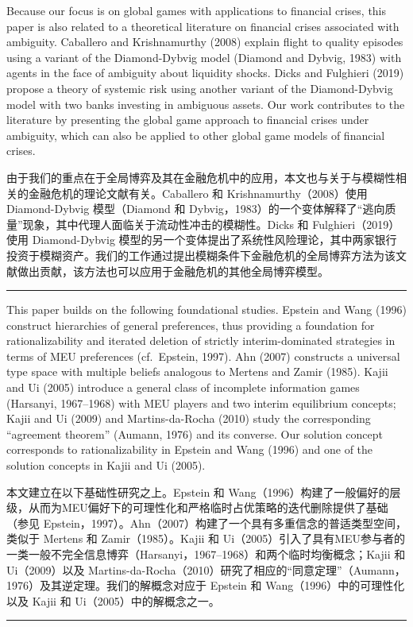 \documentclass[12pt,a4paper]{article}
\newenvironment{original}
  {\par\medskip\noindent\color{black}\ignorespaces}
  {\par\medskip}
\newenvironment{translation}
  {\par\noindent\color{darkblue}\ignorespaces}
  {\par\medskip\noindent\hrule\par\medskip}
\theoremstyle{definition}
\theoremstyle{remark}
\begin{document}
\begin{original}
Because our focus is on global games with applications to financial crises, this paper is also related to a theoretical literature on financial crises associated with ambiguity. Caballero and Krishnamurthy (2008) explain flight to quality episodes using a variant of the Diamond-Dybvig model (Diamond and Dybvig, 1983) with agents in the face of ambiguity about liquidity shocks. Dicks and Fulghieri (2019) propose a theory of systemic risk using another variant of the Diamond-Dybvig model with two banks investing in ambiguous assets. Our work contributes to the literature by presenting the global game approach to financial crises under ambiguity, which can also be applied to other global game models of financial crises.
\end{original}
\begin{translation}
由于我们的重点在于全局博弈及其在金融危机中的应用，本文也与关于与模糊性相关的金融危机的理论文献有关。Caballero 和 Krishnamurthy（2008）使用 Diamond-Dybvig 模型（Diamond 和 Dybvig，1983）的一个变体解释了``逃向质量''现象，其中代理人面临关于流动性冲击的模糊性。Dicks 和 Fulghieri（2019）使用 Diamond-Dybvig 模型的另一个变体提出了系统性风险理论，其中两家银行投资于模糊资产。我们的工作通过提出模糊条件下金融危机的全局博弈方法为该文献做出贡献，该方法也可以应用于金融危机的其他全局博弈模型。
\end{translation}

\begin{original}
This paper builds on the following foundational studies. Epstein and Wang (1996) construct hierarchies of general preferences, thus providing a foundation for rationalizability and iterated deletion of strictly interim-dominated strategies in terms of MEU preferences (cf.\ Epstein, 1997). Ahn (2007) constructs a universal type space with multiple beliefs analogous to Mertens and Zamir (1985). Kajii and Ui (2005) introduce a general class of incomplete information games (Harsanyi, 1967--1968) with MEU players and two interim equilibrium concepts; Kajii and Ui (2009) and Martins-da-Rocha (2010) study the corresponding ``agreement theorem'' (Aumann, 1976) and its converse. Our solution concept corresponds to rationalizability in Epstein and Wang (1996) and one of the solution concepts in Kajii and Ui (2005).
\end{original}
\begin{translation}
本文建立在以下基础性研究之上。Epstein 和 Wang（1996）构建了一般偏好的层级，从而为MEU偏好下的可理性化和严格临时占优策略的迭代删除提供了基础（参见 Epstein，1997）。Ahn（2007）构建了一个具有多重信念的普适类型空间，类似于 Mertens 和 Zamir（1985）。Kajii 和 Ui（2005）引入了具有MEU参与者的一类一般不完全信息博弈（Harsanyi，1967--1968）和两个临时均衡概念；Kajii 和 Ui（2009）以及 Martins-da-Rocha（2010）研究了相应的``同意定理''（Aumann，1976）及其逆定理。我们的解概念对应于 Epstein 和 Wang（1996）中的可理性化以及 Kajii 和 Ui（2005）中的解概念之一。
\end{translation}
\end{document}
